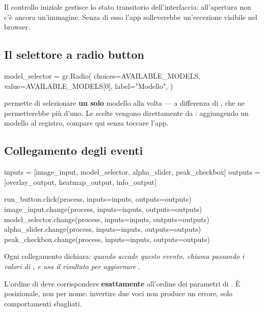 Il controllo iniziale gestisce lo stato transitorio dell'interfaccia: all'apertura non c'è ancora
un'immagine. Senza di esso l'app solleverebbe un'eccezione visibile nel browser.

\subsection{Il selettore a radio button}

\begin{idebox}
\begin{pycode}
model_selector = gr.Radio(
    choices=AVAILABLE_MODELS,
    value=AVAILABLE_MODELS[0],
    label="Modello",
)
\end{pycode}
\end{idebox}

 permette di selezionare \textbf{un solo} modello alla volta --- a differenza di
, che ne permetterebbe più d'uno. Le scelte vengono direttamente da
: aggiungendo un modello al registro, compare qui senza toccare l'app.

\subsection{Collegamento degli eventi}

\begin{idebox}
\begin{pycode}
inputs = [image_input, model_selector, alpha_slider, peak_checkbox]
outputs = [overlay_output, heatmap_output, info_output]

run_button.click(process, inputs=inputs, outputs=outputs)
image_input.change(process, inputs=inputs, outputs=outputs)
model_selector.change(process, inputs=inputs, outputs=outputs)
alpha_slider.change(process, inputs=inputs, outputs=outputs)
peak_checkbox.change(process, inputs=inputs, outputs=outputs)
\end{pycode}
\end{idebox}

Ogni collegamento dichiara: \emph{quando accade questo evento, chiama  passando i
valori di , e usa il risultato per aggiornare }.

\begin{attenzione}
L'ordine di  deve corrispondere \textbf{esattamente} all'ordine dei parametri di
. È posizionale, non per nome: invertire due voci non produce un errore, solo
comportamenti sbagliati.
\end{attenzione}

